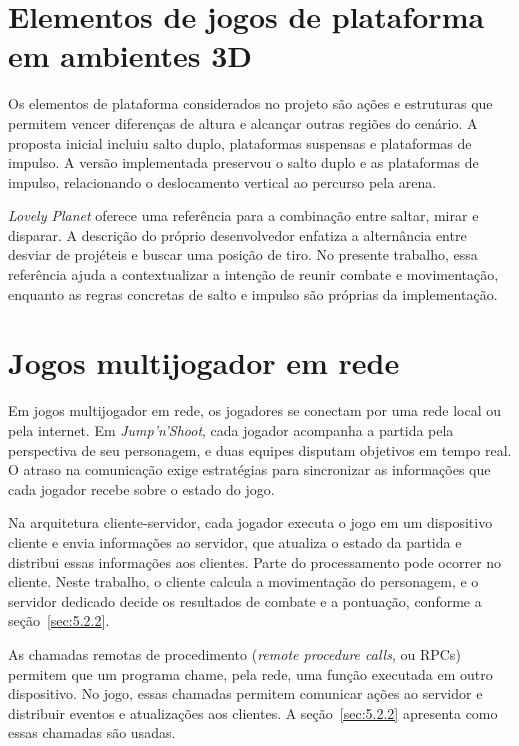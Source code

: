 \section{Elementos de jogos de plataforma em ambientes 3D}\label{sec:2.3}

Os elementos de plataforma considerados no projeto são ações e estruturas que permitem vencer diferenças de altura e alcançar outras regiões do cenário. A proposta inicial incluiu salto duplo, plataformas suspensas e plataformas de impulso. A versão implementada preservou o salto duplo e as plataformas de impulso, relacionando o deslocamento vertical ao percurso pela arena.

\textit{Lovely Planet} oferece uma referência para a combinação entre saltar, mirar e disparar. A descrição do próprio desenvolvedor enfatiza a alternância entre desviar de projéteis e buscar uma posição de tiro. No presente trabalho, essa referência ajuda a contextualizar a intenção de reunir combate e movimentação, enquanto as regras concretas de salto e impulso são próprias da implementação. \cite{LOVELY}

\section{Jogos multijogador em rede}\label{sec:2.4}

Em jogos multijogador em rede, os jogadores se conectam por uma rede local ou pela internet. Em \textit{Jump'n'Shoot}, cada jogador acompanha a partida pela perspectiva de seu personagem, e duas equipes disputam objetivos em tempo real. O atraso na comunicação exige estratégias para sincronizar as informações que cada jogador recebe sobre o estado do jogo. \cite{FIEDLER-REDE}

Na arquitetura cliente-servidor, cada jogador executa o jogo em um dispositivo cliente e envia informações ao servidor, que atualiza o estado da partida e distribui essas informações aos clientes. Parte do processamento pode ocorrer no cliente. Neste trabalho, o cliente calcula a movimentação do personagem, e o servidor dedicado decide os resultados de combate e a pontuação, conforme a seção~\ref{sec:5.2.2}. \cite{FIEDLER-REDE}

As chamadas remotas de procedimento (\textit{remote procedure calls}, ou RPCs) permitem que um programa chame, pela rede, uma função executada em outro dispositivo. No jogo, essas chamadas permitem comunicar ações ao servidor e distribuir eventos e atualizações aos clientes. A seção~\ref{sec:5.2.2} apresenta como essas chamadas são usadas. \cite{GODOT-REDE}

